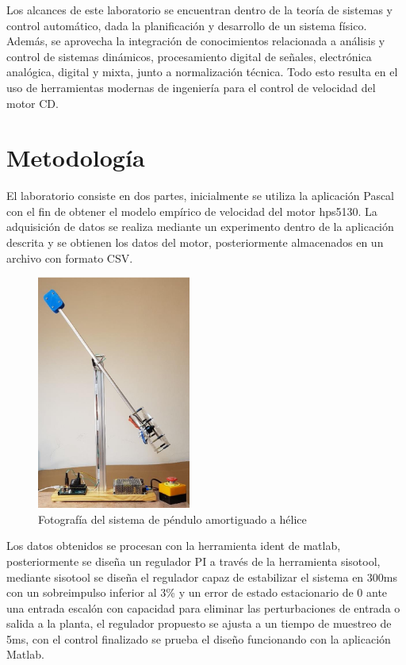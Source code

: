 \documentclass[conference]{IEEEtran}
\begin{document}
Los alcances de este laboratorio se encuentran dentro de la teoría de sistemas y control automático, dada la planificación y desarrollo de un sistema físico. Además, se aprovecha la integración de conocimientos relacionada a análisis y control de sistemas dinámicos, procesamiento digital de señales, electrónica analógica, digital y mixta, junto a normalización técnica. Todo esto resulta en el uso de herramientas modernas de ingeniería para el control de velocidad del motor CD. 


\section{Metodología}
El laboratorio consiste en dos partes, inicialmente se utiliza la aplicación Pascal con el fin de obtener el modelo empírico de velocidad del motor hps5130. La adquisición de datos se realiza mediante un experimento dentro de la aplicación descrita y se obtienen los datos del motor, posteriormente almacenados en un archivo con formato CSV.
\begin{figure}[!h]
\centering
\includegraphics[width=0.45\textwidth]{images/L02img01.png}
\caption{Fotografía del sistema de péndulo amortiguado a hélice}
\label{fig:comp_cd}
\end{figure}


Los datos obtenidos se procesan con la herramienta ident de matlab, posteriormente se diseña un regulador PI a través de la herramienta sisotool, mediante sisotool se diseña el regulador capaz de estabilizar el sistema en 300ms con un sobreimpulso inferior al 3\% y un error de estado estacionario de 0 ante una entrada escalón con capacidad para eliminar las perturbaciones de entrada o salida a la planta, el regulador propuesto se ajusta a un tiempo de muestreo de 5ms, con el control finalizado se prueba el diseño funcionando con la aplicación Matlab.
\end{document}

